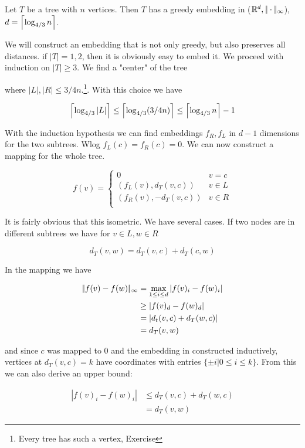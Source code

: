 \begin{thm} Let $T$ be a tree with $n$ vertices. Then $T$ has a greedy embedding in ($\mathbb{R}^d,|\!|\cdot|\!|_{\infty}$), $d=\left\lceil \log_{4/3}n \right\rceil$.
\end{thm}

\begin{pr} We will construct an embedding that is not only greedy, but also preserves all distances. if $|T|=1,2$, then it is obviously easy to embed it. We proceed with induction on $|T|\geq 3$. We find a "center" of the tree


where $|L|,|R| \leq 3/4n$.\footnote{Every tree has such a vertex, Exercise}. With this choice we have

\[\left\lceil \log_{4/3}|L| \right\rceil \leq \left\lceil \log_{4/3}(3/4n) \right\rceil \leq \left\lceil \log_{4/3}n \right\rceil-1\]

With the induction hypothesis we can find embeddings $f_R,f_L$ in $d-1$ dimensions for the two subtrees. Wlog $f_L(c) = f_R(c) = 0$. We can now construct a mapping for the whole tree.

\[f(v) = \begin{cases}
0& v=c\\
(f_L(v),d_T(v,c)) & v\in L\\
(f_R(v),-d_T(v,c)) & v\in R\\
\end{cases}\]

It is fairly obvious that this isometric. We have several cases. If two nodes are in different subtrees we have for $v\in L, w\in R$

\[d_T(v,w)=d_T(v,c)+d_T(c,w)\]

In the mapping we have

\begin{align*}
|\!|f(v)-f(w)|\!|_{\infty} &= \max_{1\leq i\leq d} |f(v)_i-f(w)_i|\\
	&\geq |f(v)_d-f(w)_d|\\
	&= |d_t(v,c)+d_T(w,c)|\\
	&=d_T(v,w)
\end{align*}

and since $c$ was mapped to $0$ and the embedding in constructed inductively, vertices at $d_T(v,c)=k$ have coordinates with entries $\{\pm i |0\leq i\leq k\}$. From this we can also derive an upper bound:

\begin{align*}
|f(v)_i-f(w)_i| &\leq d_T(v,c)+d_T(w,c)\\
	&=d_T(v,w)
\end{align*}	


\end{pr}
